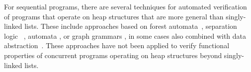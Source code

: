 For sequential programs,
there are several techniques for automated verification of programs that operate
on heap structures that are more general than singly-linked lists.
These include approaches based on forest automata~\cite{forester11,boxes13,Quy:atva13:journal}, separation logic~ \cite{InvaderCAV08,dudka13},
automata \cite{artmc12}, or graph grammars \cite{juggrnaut10}, in some
cases also combined with data
abstraction~\cite{Loginov:AbstrRefViaInductLearning:05}.
These approaches have not been applied to verify functional properties of
concurrent programs operating on heap structures beyond singly-linked lists.

